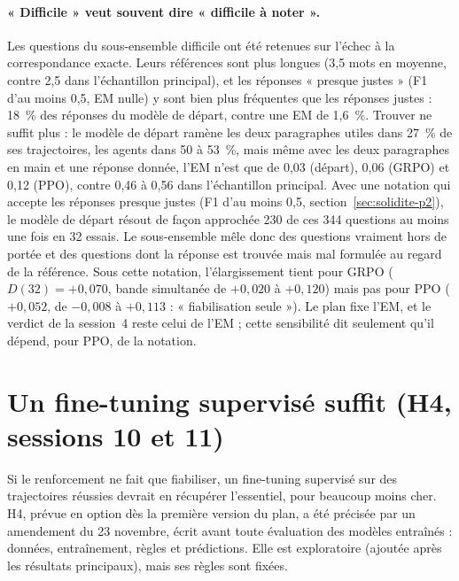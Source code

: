 \paragraph{« Difficile » veut souvent dire « difficile à noter ».} Les questions du sous-ensemble difficile ont été retenues sur l'échec à la correspondance exacte. Leurs références sont plus longues (3,5 mots en moyenne, contre 2,5 dans l'échantillon principal), et les réponses « presque justes » (F1 d'au moins 0,5, EM nulle) y sont bien plus fréquentes que les réponses justes : 18~\% des réponses du modèle de départ, contre une EM de 1,6~\%. Trouver ne suffit plus : le modèle de départ ramène les deux paragraphes utiles dans 27~\% de ses trajectoires, les agents dans 50 à 53~\%, mais même avec les deux paragraphes en main et une réponse donnée, l'EM n'est que de 0,03 (départ), 0,06 (GRPO) et 0,12 (PPO), contre 0,46 à 0,56 dans l'échantillon principal. Avec une notation qui accepte les réponses presque justes (F1 d'au moins 0,5, section~\ref{sec:solidite-p2}), le modèle de départ résout de façon approchée 230 de ces 344 questions au moins une fois en 32 essais. Le sous-ensemble mêle donc des questions vraiment hors de portée et des questions dont la réponse est trouvée mais mal formulée au regard de la référence. Sous cette notation, l'élargissement tient pour GRPO ($D(32) = +0{,}070$, bande simultanée de $+0{,}020$ à $+0{,}120$) mais pas pour PPO ($+0{,}052$, de $-0{,}008$ à $+0{,}113$ : « fiabilisation seule »). Le plan fixe l'EM, et le verdict de la session~4 reste celui de l'EM ; cette sensibilité dit seulement qu'il dépend, pour PPO, de la notation.

\section{Un fine-tuning supervisé suffit (H4, sessions 10 et 11)}\label{sec:h4-p2}

Si le renforcement ne fait que fiabiliser, un fine-tuning supervisé sur des trajectoires réussies devrait en récupérer l'essentiel, pour beaucoup moins cher. H4, prévue en option dès la première version du plan, a été précisée par un amendement du 23 novembre, écrit avant toute évaluation des modèles entraînés : données, entraînement, règles et prédictions. Elle est exploratoire (ajoutée après les résultats principaux), mais ses règles sont fixées.

